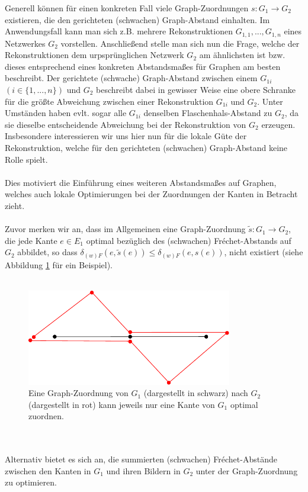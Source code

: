 \documentclass[a4paper, 12pt, twoside]{article}
\theoremstyle{Format1} %
\begin{document}
Generell können für einen konkreten Fall viele Graph-Zuordnungen $s: G_1 \to G_2$ existieren, die den gerichteten (schwachen) Graph-Abstand einhalten.
Im Anwendungsfall kann man sich z.B. mehrere Rekonstruktionen $G_{1,1}, ..., G_{1,n}$ eines Netzwerkes $G_2$ vorstellen.
Anschließend stelle man sich nun die Frage, welche der Rekonstruktionen dem urpsprünglichen Netzwerk $G_2$ am ähnlichsten ist bzw. dieses entsprechend eines konkreten Abstandsmaßes
für Graphen am besten beschreibt.
Der gerichtete (schwache) Graph-Abstand zwischen einem $G_{1i}$ $(i \in \{1,...,n\})$ und $G_2$ beschreibt dabei in gewisser Weise eine obere Schranke für die größte Abweichung zwischen
einer Rekonstruktion $G_{1i}$ und $G_2$.
Unter Umständen haben evlt. sogar alle $G_{1i}$ denselben Flaschenhals-Abstand zu $G_2$, da sie dieselbe entscheidende Abweichung bei der Rekonstruktion von $G_2$ erzeugen.
Insbesondere interessieren wir uns hier nun für die lokale Güte der Rekonstruktion, welche für den gerichteten (schwachen) Graph-Abstand keine Rolle spielt.
\\
\\
Dies motiviert die Einführung eines weiteren Abstandsmaßes auf Graphen, welches auch lokale Optimierungen bei der Zuordnungen der Kanten in Betracht zieht.
\\
\\
Zuvor merken wir an, dass im Allgemeinen eine Graph-Zuordnung $\tilde{s}: G_1 \to G_2$, die jede Kante $e \in E_1$ optimal bezüglich des (schwachen)
Fréchet-Abstands auf $G_2$ abbildet, so dass $\delta_{(w)F}(e, \tilde{s}(e)) \leq \delta_{(w)F}(e, s(e))$, nicht existiert (siehe Abbildung \ref{chapter_2_example_0} für ein Beispiel).
\\
\\
\begin{figure}[htpb]
    \centering
    \includegraphics[width=0.8\textwidth]{chapter_2_example_0.pdf}
	\caption{Eine Graph-Zuordnung von $G_1$ (dargestellt in schwarz) nach $G_2$ (dargestellt in rot) kann jeweils nur eine Kante von $G_1$ optimal zuordnen.}
    \label{chapter_2_example_0}
\end{figure}
\\
\\
Alternativ bietet es sich an, die summierten (schwachen) Fréchet-Abstände zwischen den Kanten in $G_1$ und ihren Bildern in $G_2$ unter der Graph-Zuordnung zu optimieren.
\end{document}
